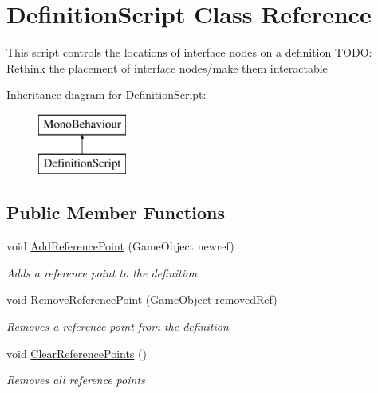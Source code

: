 \hypertarget{class_definition_script}{}\section{Definition\+Script Class Reference}
\label{class_definition_script}


This script controls the locations of interface nodes on a definition T\+O\+DO\+: Rethink the placement of interface nodes/make them interactable  


Inheritance diagram for Definition\+Script\+:\begin{figure}[H]
\begin{center}
\leavevmode
\includegraphics[height=2.000000cm]{class_definition_script}
\end{center}
\end{figure}
\subsection*{Public Member Functions}
\begin{DoxyCompactItemize}
\item 
void \hyperlink{class_definition_script_aa024bbcd14da56aba2a845998453d1ae}{Add\+Reference\+Point} (Game\+Object newref)
\begin{DoxyCompactList}\small\item\em Adds a reference point to the definition \end{DoxyCompactList}\item 
void \hyperlink{class_definition_script_a1e2cd233f3dff31d405c2a5dcd2bad37}{Remove\+Reference\+Point} (Game\+Object removed\+Ref)
\begin{DoxyCompactList}\small\item\em Removes a reference point from the definition \end{DoxyCompactList}\item 
void \hyperlink{class_definition_script_a8cb4f36965c85361ae6cb466596e2afd}{Clear\+Reference\+Points} ()
\begin{DoxyCompactList}\small\item\em Removes all reference points \end{DoxyCompactList}\end{DoxyCompactItemize}
